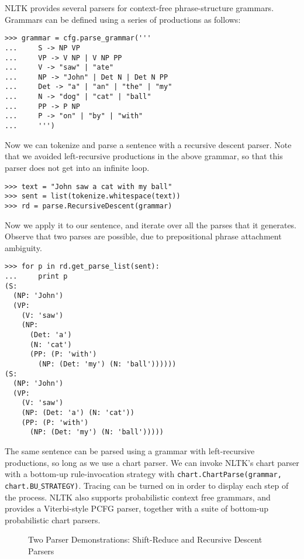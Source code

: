 \documentclass[11pt]{article}
\begin{document}
NLTK provides several parsers for context-free phrase-structure
grammars.  Grammars can be defined using a series of productions as follows:

{\small\begin{verbatim}
>>> grammar = cfg.parse_grammar('''
...     S -> NP VP
...     VP -> V NP | V NP PP
...     V -> "saw" | "ate"
...     NP -> "John" | Det N | Det N PP
...     Det -> "a" | "an" | "the" | "my"
...     N -> "dog" | "cat" | "ball"
...     PP -> P NP
...     P -> "on" | "by" | "with"
...     ''')
\end{verbatim}}

\noindent
Now we can tokenize and parse a sentence with a recursive descent
parser.  Note that we avoided left-recursive productions in the above
grammar, so that this parser does not get into an infinite loop.

{\small\begin{verbatim}
>>> text = "John saw a cat with my ball"
>>> sent = list(tokenize.whitespace(text))
>>> rd = parse.RecursiveDescent(grammar)
\end{verbatim}}

Now we apply it to our sentence, and iterate over all the parses that
it generates.  Observe that two parses are possible, due to
prepositional phrase attachment ambiguity.

{\small\begin{verbatim}
>>> for p in rd.get_parse_list(sent):
...     print p
(S:
  (NP: 'John')
  (VP:
    (V: 'saw')
    (NP:
      (Det: 'a')
      (N: 'cat')
      (PP: (P: 'with')
        (NP: (Det: 'my') (N: 'ball'))))))
(S:
  (NP: 'John')
  (VP:
    (V: 'saw')
    (NP: (Det: 'a') (N: 'cat'))
    (PP: (P: 'with')
      (NP: (Det: 'my') (N: 'ball')))))
\end{verbatim}}

\noindent
The same sentence can be parsed using a grammar with left-recursive
productions, so long as we use a chart parser.  We can invoke NLTK's
chart parser with a bottom-up rule-invocation strategy with
\texttt{chart.ChartParse(grammar, chart.BU$\_$STRATEGY)}.  Tracing can
be turned on in order to display each step of the process.  NLTK also
supports probabilistic context free grammars, and provides a
Viterbi-style PCFG parser, together with a suite of bottom-up
probabilistic chart parsers.

\begin{figure*}[tb]
\centerline{}
\vspace{4ex}
\centerline{}
\caption{Two Parser Demonstrations: Shift-Reduce and Recursive Descent Parsers}
\label{fig:parser}
\end{figure*}
\end{document}
